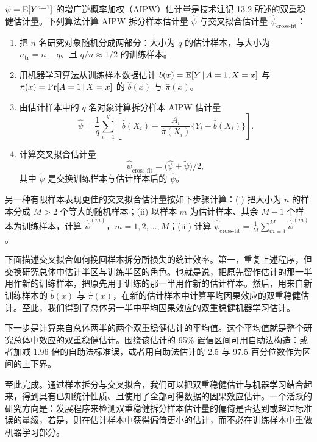 \renewcommand{\TPname}{技术注记（Technical Point）}
\begin{techpoint}[增广逆概率加权拆分样本与交叉拟合估计量]
$\psi=\mathrm{E}[Y^{a=1}]$ 的增广逆概率加权（AIPW）估计量是技术注记 13.2 所述的双重稳健估计量。下列算法计算 AIPW 拆分样本估计量 $\hat\psi$ 与交叉拟合估计量 $\hat\psi_{\text{cross-fit}}$：

\begin{enumerate}[label=(\roman*)]
\item 把 $n$ 名研究对象随机分成两部分：大小为 $q$ 的估计样本，与大小为 $n_{\mathrm{tr}}=n-q$、且 $q/n\approx 1/2$ 的训练样本。
\item 用机器学习算法从训练样本数据估计 $b(x)=\mathrm{E}[Y\,|\, A=1,X=x]$ 与 $\pi(x)=\Pr[A=1\,|\, X=x]$ 的 $\hat b(x)$ 与 $\hat\pi(x)$。
\item 由估计样本中的 $q$ 名对象计算拆分样本 AIPW 估计量
\[
\hat\psi=\frac{1}{q}\sum_{i=1}^{q}\left[\hat b(X_i)+\frac{A_i}{\hat\pi(X_i)}\bigl\{Y_i-\hat b(X_i)\bigr\}\right].
\]
\item 计算交叉拟合估计量
\[
\hat\psi_{\text{cross-fit}}=\bigl(\hat\psi+\tilde\psi\bigr)\big/2,
\]
其中 $\tilde\psi$ 是交换训练样本与估计样本后的 $\hat\psi$。
\end{enumerate}

另一种有限样本表现更佳的交叉拟合估计量按如下步骤计算：(i) 把大小为 $n$ 的样本分成 $M>2$ 个等大的随机样本；(ii) 以样本 $m$ 为估计样本、其余 $M-1$ 个样本为训练样本，计算 $\hat\psi^{(m)}$，$m=1,2,\ldots,M$；(iii) 计算 $\hat\psi_{\text{cross-fit}}=\frac{1}{M}\sum_{m=1}^{M}\hat\psi^{(m)}$。
\end{techpoint}
\renewcommand{\TPname}{技术注记}

下面描述交叉拟合如何挽回样本拆分所损失的统计效率。第一，重复上述程序，但交换研究总体中估计半区与训练半区的角色。也就是说，把原先留作估计的那一半用作新的训练样本，把原先用于训练的那一半用作新的估计样本。然后，用来自新训练样本的 $\hat b(x)$ 与 $\hat\pi(x)$，在新的估计样本中计算平均因果效应的双重稳健估计。至此，我们得到了总体另一半中平均因果效应的双重稳健机器学习估计。

下一步是计算来自总体两半的两个双重稳健估计的平均值。这个平均值就是整个研究总体中效应的双重稳健估计。围绕该估计的 95\% 置信区间可用自助法构造：或者加减 1.96 倍的自助法标准误，或者用自助法估计的 2.5 与 97.5 百分位数作为区间的上下界。

至此完成。通过样本拆分与交叉拟合，我们可以把双重稳健估计与机器学习结合起来，得到具有已知统计性质、且使用了全部可得数据的因果效应估计。一个活跃的研究方向是：发展程序来检测双重稳健拆分样本估计量的偏倚是否达到或超过标准误的量级，若是，则在估计样本中获得偏倚更小的估计，而不必在训练样本中重做机器学习部分。

